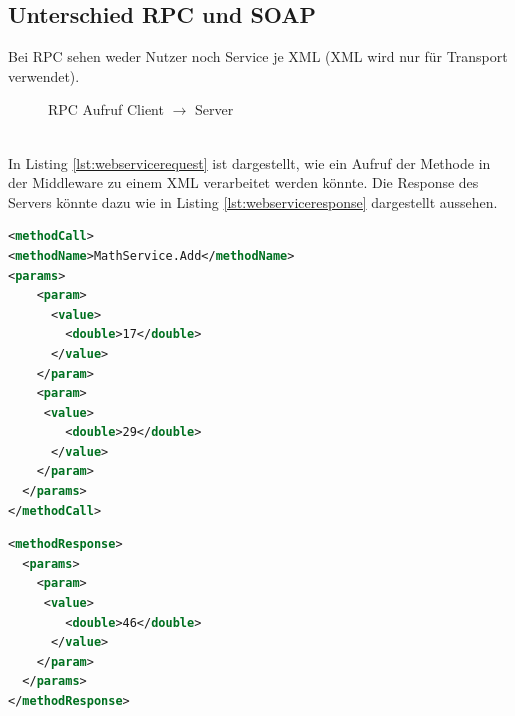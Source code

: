\subsection{Unterschied RPC und SOAP}
Bei RPC sehen weder Nutzer noch Service je XML (XML wird nur für Transport verwendet).
\begin{figure}[h!]
\centering
\small
{}
\caption{RPC Aufruf Client $\rightarrow$ Server}
\end{figure}
\\
In Listing \ref{lst:webservicerequest} ist dargestellt, wie ein Aufruf der Methode  in der Middleware zu einem XML verarbeitet werden könnte. Die Response des Servers könnte dazu wie in Listing \ref{lst:webserviceresponse} dargestellt aussehen.\\
\begin{minipage}{0.45\textwidth}
\begin{lstlisting}[language=XML, caption={Web Service Request}, label=lst:webservicerequest]
<methodCall> 
<methodName>MathService.Add</methodName> 
<params>
    <param>
      <value>
        <double>17</double>
      </value>
    </param>
    <param>
	 <value> 
		<double>29</double>
      </value>
    </param>
  </params>
</methodCall>
\end{lstlisting}
\end{minipage}
\hfill
\begin{minipage}{0.45\textwidth}
\begin{lstlisting}[language=XML, caption={Web Service Response}, label=lst:webserviceresponse]
<methodResponse>
  <params>
	<param>
	 <value>
        <double>46</double>
      </value>
    </param>
  </params>
</methodResponse>
\end{lstlisting}
\end{minipage}\\
